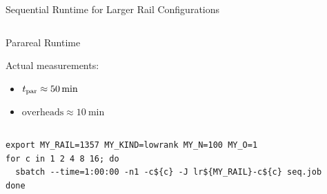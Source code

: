 \begin{frame}[b,fragile]{Sequential Runtime for Larger Rail Configurations}
\begin{columns}[c]
\begin{block}{Parareal Runtime}
\begin{itemize}
    \end{itemize}
    \medskip
    Actual measurements:
    \begin{itemize}
      \item
        $t_\text{par} \approx \SI{50}{\minute}$
      \item
        $\text{overheads} \approx \SI{10}{\minute}$
    \end{itemize}
  \end{block}
  \hyperlink{runtime}{}
  \hyperlink{speedup<2>}{}
  \end{columns}
  \onslide
  \vfill
  \begin{lstlisting}
export MY_RAIL=1357 MY_KIND=lowrank MY_N=100 MY_O=1
for c in 1 2 4 8 16; do
  sbatch --time=1:00:00 -n1 -c${c} -J lr${MY_RAIL}-c${c} seq.job
done
  \end{lstlisting}
\end{frame}

